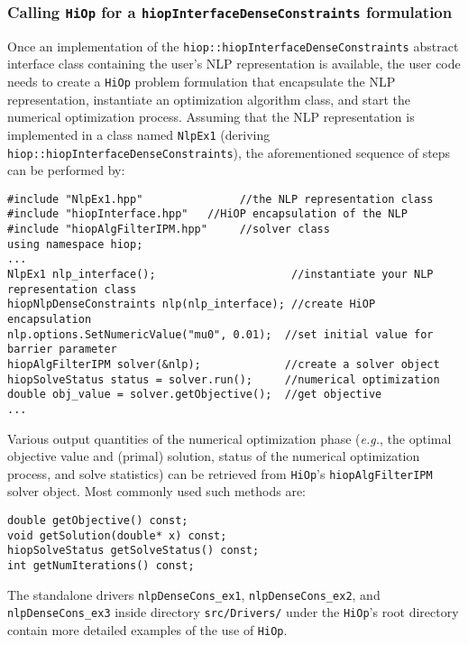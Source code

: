 \documentclass[11pt]{article}
\newcommand{\Hi}{\texttt{HiOp}\xspace}
\begin{document}
\subsubsection{Calling \Hi for a \texttt{hiopInterfaceDenseConstraints} formulation}
Once an implementation of the \texttt{hiop::hiopInterfaceDenseConstraints} abstract interface class containing the user's NLP representation is available, the  user code needs to create a \Hi problem formulation that encapsulate the NLP representation, instantiate an optimization algorithm class, and start the numerical optimization process. Assuming that the NLP representation is implemented in a class named \texttt{NlpEx1} (deriving \texttt{hiop::hiopInterfaceDenseConstraints}), the aforementioned sequence of steps can be performed by:
\begin{lstlisting}
#include "NlpEx1.hpp"               //the NLP representation class
#include "hiopInterface.hpp"   //HiOP encapsulation of the NLP
#include "hiopAlgFilterIPM.hpp"     //solver class
using namespace hiop;
...
NlpEx1 nlp_interface();                     //instantiate your NLP representation class
hiopNlpDenseConstraints nlp(nlp_interface); //create HiOP encapsulation
nlp.options.SetNumericValue("mu0", 0.01);  //set initial value for  barrier parameter
hiopAlgFilterIPM solver(&nlp);             //create a solver object
hiopSolveStatus status = solver.run();     //numerical optimization
double obj_value = solver.getObjective();  //get objective
...
\end{lstlisting}
Various output quantities of the numerical optimization phase (\textit{e.g.}, the optimal objective value and (primal) solution, status of the numerical optimization process, and solve statistics) can be retrieved from \Hi's \texttt{hiopAlgFilterIPM} solver object. Most commonly used such methods are: 
\begin{lstlisting}
double getObjective() const;
void getSolution(double* x) const;
hiopSolveStatus getSolveStatus() const;
int getNumIterations() const;
\end{lstlisting} 
The standalone drivers \texttt{nlpDenseCons\_ex1}, \texttt{nlpDenseCons\_ex2}, and \texttt{nlpDenseCons\_ex3} inside directory \texttt{src/Drivers/} under the \Hi's root directory contain more detailed examples of the use of \Hi.


\end{document}
